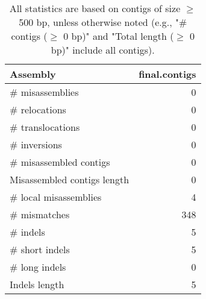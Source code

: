 \documentclass[12pt,a4paper]{article}
\begin{document}
\begin{table}[ht]
\begin{center}
\caption{All statistics are based on contigs of size $\geq$ 500 bp, unless otherwise noted (e.g., "\# contigs ($\geq$ 0 bp)" and "Total length ($\geq$ 0 bp)" include all contigs).}
\begin{tabular}{|l*{1}{|r}|}
\hline
Assembly & final.contigs \\ \hline
\# misassemblies & 0 \\ \hline
\hspace{5mm}\# relocations & 0 \\ \hline
\hspace{5mm}\# translocations & 0 \\ \hline
\hspace{5mm}\# inversions & 0 \\ \hline
\# misassembled contigs & 0 \\ \hline
Misassembled contigs length & 0 \\ \hline
\# local misassemblies & 4 \\ \hline
\# mismatches & 348 \\ \hline
\# indels & 5 \\ \hline
\hspace{5mm}\# short indels & 5 \\ \hline
\hspace{5mm}\# long indels & 0 \\ \hline
Indels length & 5 \\ \hline
\end{tabular}
\end{center}
\end{table}
\end{document}
